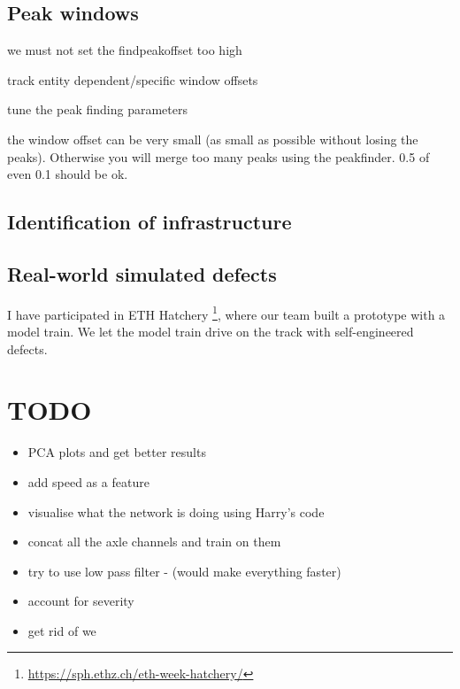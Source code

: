 \subsection{Peak windows}
we must not set the findpeakoffset too high

track entity dependent/specific window offsets

tune the peak finding parameters

the window offset can be very small (as small as possible without losing the peaks). Otherwise you will merge too many peaks using the peakfinder. 0.5 of even 0.1 should be ok. 

\subsection{Identification of infrastructure}
	
\subsection{Real-world simulated defects}
I have participated in ETH Hatchery \footnote{\url{https://sph.ethz.ch/eth-week-hatchery/}}, where our team built a prototype with a model train. We let the model train drive on the track with self-engineered defects. 


\newpage
\section{TODO}
\begin{itemize}
	\item PCA plots and get better results
	\item add speed as a feature
	\item visualise what the network is doing using Harry's code
	\item concat all the axle channels and train on them
	\item try to use low pass filter - (would make everything faster)
	\item account for severity
	\item get rid of we
\end{itemize}

